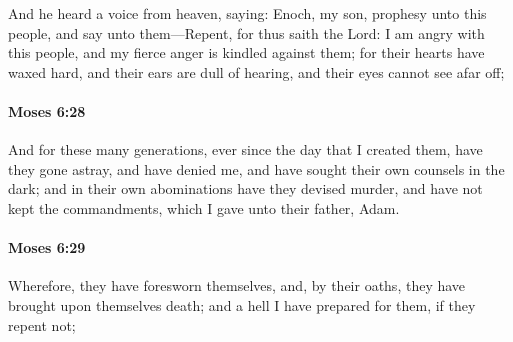 			And he heard a voice from heaven, saying: Enoch, my son, prophesy unto this people, and say unto them---Repent, for thus saith the Lord: I am angry with this people, and my fierce anger is kindled against them; for their hearts have waxed hard, and their ears are dull of hearing, and their eyes cannot see afar off;


		\paragraph{Moses 6:28} %
			\label{MOSES-6-28}

			And for these many generations, ever since the day that I created them, have they gone astray, and have denied me, and have sought their own counsels in the dark; and in their own abominations have they devised murder, and have not kept the commandments, which I gave unto their father, Adam.


		\paragraph{Moses 6:29} %
			\label{MOSES-6-29}

			Wherefore, they have foresworn themselves, and, by their oaths, they have brought upon themselves death; and a hell I have prepared for them, if they repent not;


